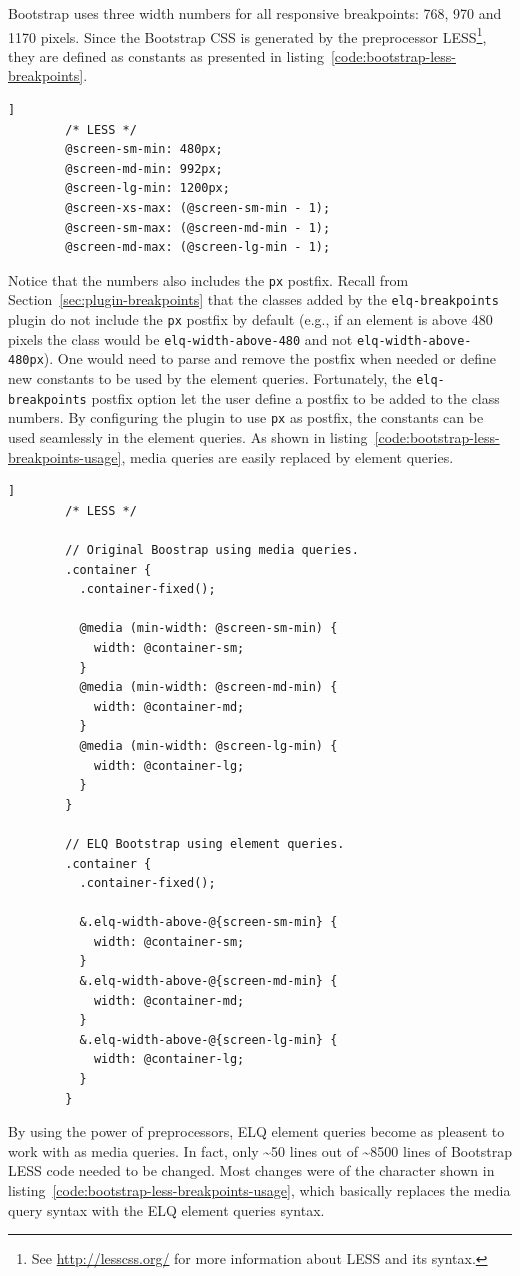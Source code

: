 \documentclass[a4paper,11pt]{kth-mag}
\newcommand{\code}[1]{\texttt{#1}}
\begin{document}
      Bootstrap uses three width numbers for all responsive breakpoints: 768, 970 and 1170 pixels.
      Since the Bootstrap \gls{CSS} is generated by the preprocessor LESS\footnote{See \url{http://lesscss.org/} for more information about LESS and its syntax.}, they are defined as constants as presented in listing~\ref{code:bootstrap-less-breakpoints}.
      \begin{lstlisting}[gobble=8,label={code:bootstrap-less-breakpoints},caption={},captionpos=b]]
        /* LESS */
        @screen-sm-min: 480px;
        @screen-md-min: 992px;
        @screen-lg-min: 1200px;
        @screen-xs-max: (@screen-sm-min - 1);
        @screen-sm-max: (@screen-md-min - 1);
        @screen-md-max: (@screen-lg-min - 1);
      \end{lstlisting}
      Notice that the numbers also includes the \code{px} postfix.
      Recall from Section~\ref{sec:plugin-breakpoints} that the classes added by the \code{elq-breakpoints} plugin do not include the \code{px} postfix by default (e.g., if an element is above 480 pixels the class would be \code{elq-width-above-480} and not \code{elq-width-above-480px}).
      One would need to parse and remove the postfix when needed or define new constants to be used by the element queries.
      Fortunately, the \code{elq-breakpoints} postfix option let the user define a postfix to be added to the class numbers.
      By configuring the plugin to use \code{px} as postfix, the constants can be used seamlessly in the element queries.
      As shown in listing~\ref{code:bootstrap-less-breakpoints-usage}, media queries are easily replaced by element queries.
      \begin{lstlisting}[gobble=8,label={code:bootstrap-less-breakpoints-usage},caption={},captionpos=b]]
        /* LESS */

        // Original Boostrap using media queries.
        .container {
          .container-fixed();

          @media (min-width: @screen-sm-min) {
            width: @container-sm;
          }
          @media (min-width: @screen-md-min) {
            width: @container-md;
          }
          @media (min-width: @screen-lg-min) {
            width: @container-lg;
          }
        }

        // ELQ Bootstrap using element queries.
        .container {
          .container-fixed();

          &.elq-width-above-@{screen-sm-min} {
            width: @container-sm;
          }
          &.elq-width-above-@{screen-md-min} {
            width: @container-md;
          }
          &.elq-width-above-@{screen-lg-min} {
            width: @container-lg;
          }
        }
      \end{lstlisting}
      By using the power of preprocessors, \gls{ELQ} element queries become as pleasent to work with as media queries.
      In fact, only \textasciitilde50 lines out of \textasciitilde8500 lines of Bootstrap LESS code needed to be changed.
      Most changes were of the character shown in listing~\ref{code:bootstrap-less-breakpoints-usage}, which basically replaces the media query syntax with the \gls{ELQ} element queries syntax.
\end{document}
